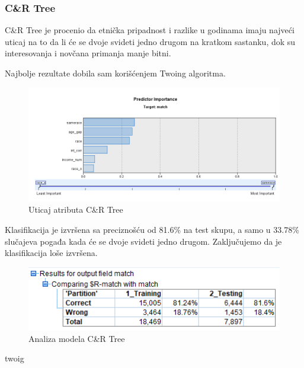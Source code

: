 \documentclass{article}
\begin{document}
\subsubsection{C\&R Tree}
C\&R Tree je procenio da etnička pripadnost i razlike u godinama imaju najveći uticaj na to da li će se dvoje svideti jedno drugom na kratkom sastanku, dok su interesovanja i novčana primanja manje bitni. \par
Najbolje rezultate dobila sam korišćenjem Twoing algoritma. \par
\begin{figure}[h!]
\centering
\includegraphics[scale=0.36]{graphics/impcrt.png}
\caption{Uticaj atributa C\&R Tree}
\label{fig:impcrt}
\end{figure}
\FloatBarrier
Klasifikacija je izvršena sa preciznošću od 81.6\% na test skupu, a samo u 33.78\% slučajeva pogađa kada će se dvoje svideti jedno drugom. Zaključujemo da je klasifikacija loše izvršena.
\begin{figure}[h!]
\centering
\includegraphics[scale=0.6]{graphics/analcrt.png}
\caption{Analiza modela C\&R Tree}
\label{fig:analcrt}
\end{figure}
twoig
\FloatBarrier
\end{document}
